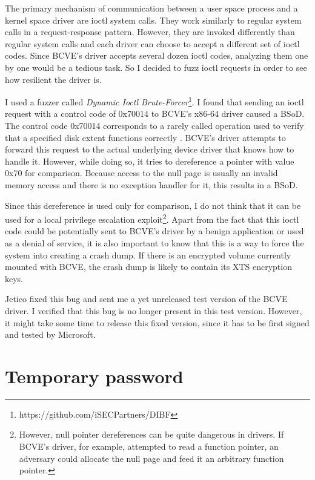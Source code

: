 \documentclass[thesis=B,english]{FITthesis}[2012/10/20]
\begin{document}
	The primary mechanism of communication between a user space process and a kernel space driver are ioctl system calls. They work similarly to regular system calls in a request-response pattern. However, they are invoked differently than regular system calls and each driver can choose to accept a different set of ioctl codes. Since BCVE's driver accepts several dozen ioctl codes, analyzing them one by one would be a tedious task. So I decided to fuzz ioctl requests in order to see how resilient the driver is.
	
	I used a fuzzer called \textit{Dynamic Ioctl Brute-Forcer}\footnote{https://github.com/iSECPartners/DIBF}. I found that sending an ioctl request with a control code of 0x70014 to BCVE's x86-64 driver caused a BSoD. The control code 0x70014 corresponds to a rarely called operation used to verify that a specified disk extent functions correctly \cite{ioctl}. BCVE's driver attempts to forward this request to the actual underlying device driver that knows how to handle it. However, while doing so, it tries to dereference a pointer with value 0x70 for comparison. Because access to the null page is usually an invalid memory access and there is no exception handler for it, this results in a BSoD.
	
	Since this dereference is used only for comparison, I do not think that it can be used for a local privilege escalation exploit\footnote{However, null pointer dereferences can be quite dangerous in drivers. If BCVE's driver, for example, attempted to read a function pointer, an adversary could allocate the null page and feed it an arbitrary function pointer.}. Apart from the fact that this ioctl code could be potentially sent to BCVE's driver by a benign application or used as a denial of service, it is also important to know that this is a way to force the system into creating a crash dump. If there is an encrypted volume currently mounted with BCVE, the crash dump is likely to contain its XTS encryption keys.
	
	Jetico fixed this bug and sent me a yet unreleased test version of the BCVE driver. I verified that this bug is no longer present in this test version. However, it might take some time to release this fixed version, since it has to be first signed and tested by Microsoft.
	
	\section{Temporary password}
	
\end{document}
